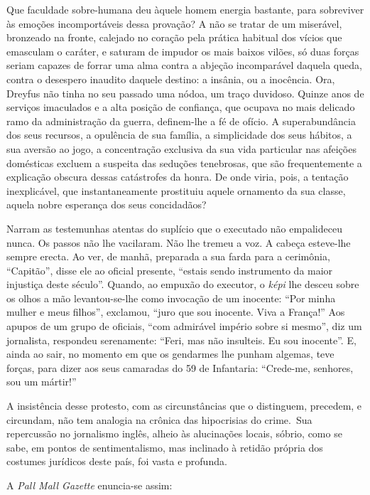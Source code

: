 Que faculdade sobre-humana deu àquele homem energia bastante, para
sobreviver às emoções incomportáveis dessa provação? A não se tratar de
um miserável, bronzeado na fronte, calejado no coração pela prática
habitual dos vícios que emasculam o caráter, e saturam de impudor os
mais baixos vilões, só duas forças seriam capazes de forrar uma alma
contra a abjeção incomparável daquela queda, contra o desespero
inaudito daquele destino: a insânia, ou a inocência. Ora, Dreyfus não
tinha no seu passado uma nódoa, um traço duvidoso. Quinze anos de
serviços imaculados e a alta posição de confiança, que ocupava no mais
delicado ramo da administração da guerra, definem-lhe a fé de ofício.
A superabundância dos seus recursos, a opulência de sua família, a
simplicidade dos seus hábitos, a sua aversão ao jogo, a concentração
exclusiva da sua vida particular nas afeições domésticas excluem a
suspeita das seduções tenebrosas, que são frequentemente a explicação
obscura dessas catástrofes da honra. De onde viria, pois, a tentação
inexplicável, que instantaneamente prostituiu aquele ornamento da sua
classe, aquela nobre esperança dos seus concidadãos?

Narram as testemunhas atentas do suplício que o executado não
empalideceu nunca. Os passos não lhe vacilaram. Não lhe tremeu a voz. A
cabeça esteve-lhe sempre erecta. Ao ver, de manhã, preparada a sua
farda para a cerimônia, ``Capitão'', disse
ele ao oficial presente, ``estais sendo instrumento da
maior injustiça deste século''. Quando, ao empuxão do
executor, o \textit{képi} lhe desceu sobre os olhos a mão levantou-se-lhe
como invocação de um inocente: ``Por minha mulher e meus
filhos'', exclamou, ``juro que sou inocente.
Viva a França!'' Aos apupos de um grupo de oficiais,
``com admirável império sobre si mesmo'', diz
um jornalista, respondeu serenamente: ``Feri, mas não
insulteis. Eu sou inocente''. E, ainda ao sair, no momento
em que os gendarmes lhe punham algemas, teve forças, para dizer aos
seus camaradas do 59 de Infantaria: ``Crede-me,
senhores, sou um mártir!''

A insistência desse protesto, com as circunstâncias que o distinguem,
precedem, e circundam, não tem analogia na crônica das hipocrisias do
crime.~Sua repercussão no jornalismo inglês, alheio às alucinações
locais, sóbrio, como se sabe, em pontos de sentimentalismo, mas
inclinado à retidão própria dos costumes jurídicos deste país, foi
vasta e profunda.

A \textit{Pall Mall Gazette} enuncia-se assim:

